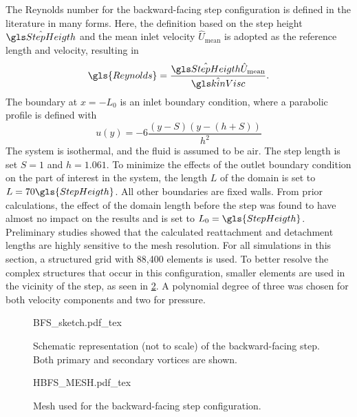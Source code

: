 The Reynolds number for the backward-facing step configuration is defined in the literature in many forms. Here, the definition based on the step height $\glsHat{StepHeigth}$ and the mean inlet velocity $\hat U_{\text{mean}}$ is adopted as the reference length and velocity, resulting in
\begin{equation}
	\gls{Reynolds}= \frac{\glsHat{StepHeigth}\hat U_{\text{mean}}}{\glsHat{kinVisc}}.
\end{equation}
The boundary at $x = - L_0$ is an inlet boundary condition, where a parabolic profile is defined with %
\begin{equation}
	u(y) = -6\frac{( y- S)( y-( h+ S))}{h^2} %
\end{equation}
The system is isothermal, and the fluid is assumed to be air. The step length is set $S=1$ and $h = 1.061$. To minimize the effects of the outlet boundary condition on the part of interest in the system, the length $L$ of the domain is set to $L = 70 \gls{StepHeigth}$. All other boundaries are fixed walls. From prior calculations, the effect of the domain length before the step was found to have almost no impact on the results and is set to $L_0 = \gls{StepHeigth}$. Preliminary studies showed that the calculated reattachment and detachment lengths are highly sensitive to the mesh resolution. For all simulations in this section, a structured grid with 88,400 elements is used. To better resolve the complex structures that occur in this configuration, smaller elements are used in the vicinity of the step, as seen in \cref{bfsmesh}.  A polynomial degree of three was chosen for both velocity components and two for pressure.

\begin{figure}[tb]
	\begin{center}
		\def\svgwidth{0.9\textwidth}
		{BFS_sketch.pdf_tex}
		\caption[Schematic representation of the backward-facing step.]{Schematic representation (not to scale) of the backward-facing step. Both primary and secondary vortices are shown.}
		\label{BFSsketch}
	\end{center}
\end{figure}

\begin{figure}[tb]
	\begin{center}
		\def\svgwidth{0.8\textwidth}
		{HBFS_MESH.pdf_tex}
		\caption{Mesh used for the backward-facing step configuration.}
		\label{bfsmesh}
	\end{center}
\end{figure}

